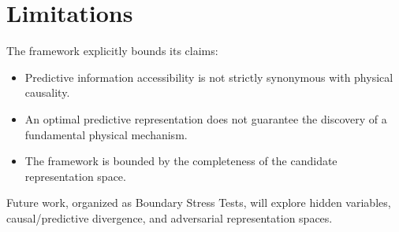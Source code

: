 \section{Limitations}
The framework explicitly bounds its claims:
\begin{itemize}
    \item Predictive information accessibility is not strictly synonymous with physical causality.
    \item An optimal predictive representation does not guarantee the discovery of a fundamental physical mechanism.
    \item The framework is bounded by the completeness of the candidate representation space.
\end{itemize}
Future work, organized as Boundary Stress Tests, will explore hidden variables, causal/predictive divergence, and adversarial representation spaces.
